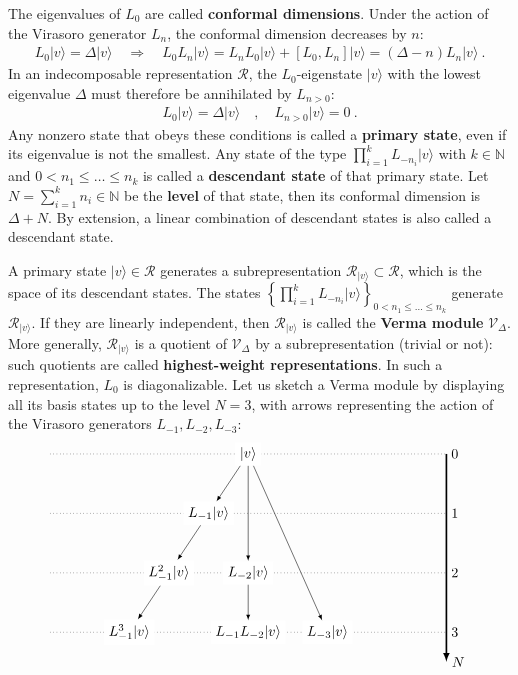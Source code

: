 \documentclass[12pt, a4paper]{article}
\theoremstyle{break}
\begin{document}
The eigenvalues of $L_0$ are called \textbf{conformal dimensions}. Under the action of the Virasoro generator $L_n$, the conformal dimension decreases by $n$:
\begin{align}
 L_0|v\rangle = \Delta|v\rangle \quad \Rightarrow\quad  L_0 L_n|v\rangle = L_nL_0|v\rangle + [L_0, L_n] |v\rangle  = (\Delta-n)L_n|v\rangle \ .
\end{align}
In an indecomposable representation $\mathcal{R}$, the $L_0$-eigenstate $|v\rangle$ with the lowest eigenvalue $\Delta$ must therefore be annihilated by $L_{n>0}$:
\begin{align}
  L_0 |v\rangle = \Delta |v\rangle \quad , \quad L_{n>0} |v\rangle = 0\ .
 \end{align}
Any nonzero state that obeys these conditions is called a \textbf{primary state}, even if its eigenvalue is not the smallest. Any state of the type $\prod_{i=1}^k L_{-n_i} |v\rangle$ with $k\in\mathbb{N}$ and $ 0<n_1\leq \dots \leq n_k$ is called a \textbf{descendant state} of that primary state. Let  $N=\sum_{i=1}^k n_i \in\mathbb{N}$ be the  \textbf{level} of that state, then its conformal dimension is $\Delta+N$. By extension, a linear combination of descendant states is also called a descendant state. 

A primary state $|v\rangle \in \mathcal{R}$ generates a subrepresentation $\mathcal{R}_{|v\rangle}\subset\mathcal{R}$, which is the space of its descendant states. The states $\left\{\prod_{i=1}^k L_{-n_i} |v\rangle\right\}_{0<n_1\leq \dots \leq n_k}$ generate $\mathcal{R}_{|v\rangle}$. If they are linearly independent, then $\mathcal{R}_{|v\rangle}$ is called the \textbf{Verma module} $\mathcal{V}_\Delta$. More generally, $\mathcal{R}_{|v\rangle}$ is a quotient of $\mathcal{V}_\Delta$ by a subrepresentation (trivial or not): such quotients are called \textbf{highest-weight representations}. In such a representation, $L_0$ is diagonalizable. 
Let us sketch a Verma module by displaying all its basis states up to the level $N=3$, with arrows representing the action of the Virasoro generators $L_{-1},L_{-2},L_{-3}$:
\begin{align}
 \begin{tikzpicture}[scale = .25, baseline=(current  bounding  box.center)]
  \draw[-latex, very thick] (20, 0) -- (20, -21) node [right] {$N$};
  \foreach \x in {0, ..., 3}
  {
  \draw [dotted] (-20, {-6*\x}) -- (20, {-6*\x}) node [right] {${\x}$};
  }
  \node[fill = white] at (0, 0) (0) {$|v\rangle$};
  \node[fill = white] at (-4,-6) (1) {$L_{-1}|v\rangle$};
  \node[fill = white] at (-8, -12) (11) {$L_{-1}^2|v\rangle$};
  \node[fill = white] at (-12, -18) (111) {$L_{-1}^3|v\rangle$};
  \node[fill = white] at (0,-12) (2) {$L_{-2}|v\rangle$};
  \node[fill = white] at (0,-18) (12) {$L_{-1}L_{-2}|v\rangle$};
  \node[fill = white] at (8,-18) (3) {$L_{-3}|v\rangle$};
  \draw[-latex] (0) -- (1);
  \draw[-latex] (1) -- (11);
  \draw[-latex] (11) -- (111);
  \draw[-latex] (0) -- (2);
  \draw[-latex] (0) -- (3);
  \draw[-latex] (2) -- (12);
 \end{tikzpicture}
\end{align}
\end{document}
